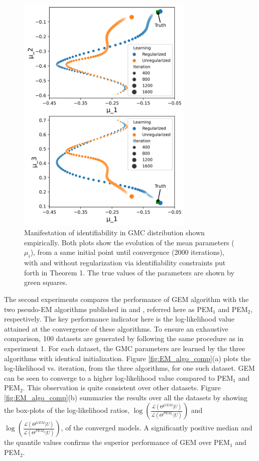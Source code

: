 \documentclass{article}
\begin{document}
\begin{figure}[ht]
\includegraphics[width= 240pt,keepaspectratio]{figures/Identifiability_Experiment.png}
\caption{Manifestation of identifiability in GMC distribution shown empirically. Both plots show the evolution of the mean parameters ($\mu_i$), from a same initial point until convergence (2000 iterations), with and without regularization via identifiability constraints put forth in Theorem 1. The true values of the  parameters are shown by green squares.}
\label{fig:identifiability_exp}
\end{figure} 

The second experiments compares the performance of GEM algorithm with the two pseudo-EM algorithms published in \citet{Bhattacharya2014} and \citet{Tewari2011}, referred here as PEM$_1$ and PEM$_2$, respectively. The key performance indicator here is the log-likelihood value attained at the convergence of these algorithms. To ensure an exhaustive comparison, 100 datasets are generated by following the same procedure as in experiment 1. For each dataset, the GMC parameters are learned by the three algorithms with identical initialization. Figure \ref{fig:EM_algo_comp}(a) plots the log-likelihood vs. iteration, from the three algorithms, for one such dataset. GEM can be seen to converge to a higher log-likelihood value compared to PEM$_1$ and PEM$_2$. This observation is quite consistent over other datasets. Figure \ref{fig:EM_algo_comp}(b) summaries the results over all the datasets by showing the box-plots of the log-likelihood ratios, $\log\left( \frac{\mathcal{L}\left(\Theta^{GEM}|U\right)}{\mathcal{L}\left(\Theta^{PEM_1}|U\right)}\right)$ and $\log\left( \frac{\mathcal{L}\left(\Theta^{GEM}|U\right)}{\mathcal{L}\left(\Theta^{PEM_2}|U\right)}\right)$, of the converged models. A significantly positive median and the quantile values confirms the superior performance of GEM over PEM$_1$ and PEM$_2$.
\end{document}
